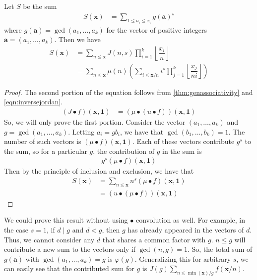 \documentclass[elemannt.tex]{subfile}
\begin{document}
		\begin{theorem}
			Let $S$ be the sum
				\begin{align*}
					S(\mathbf{x})
						& = \sum_{1\leq a_i\leq x_i}g(\mathbf{a})^{s}
				\end{align*}
			where $g(\mathbf{a})=\gcd(a_{1},\ldots,a_{k})$ for the vector of positive integers $\mathbf{a}=(a_{1},\ldots,a_{k})$. Then we have
				\begin{align*}
					S(\mathbf{x})
						& = \sum_{n\leq\mathbf{x}}J(n, s)\prod_{i=1}^{k}\left\lfloor\dfrac{x_i}{n}\right\rfloor\\
						& = \sum_{n\leq\mathbf{x}}\mu(n)\left(\sum_{i\leq\mathbf{x}/n}i^{s}\prod_{j=1}^{k}\left\lfloor\dfrac{x_j}{ni}\right\rfloor\right)
				\end{align*}
			
				\begin{proof}
					The second portion of the equation follows from \autoref{thm:genassociativity} and \ref{eqn:inversejordan}.
						\begin{align*}
							(J\bullet f)(\mathbf{x},\mathbf{1})
								& = (\mu\bullet (u\bullet f))(\mathbf{x},\mathbf{1})
						\end{align*}
					So, we will only prove the first portion. Consider the vector $(a_{1},\ldots,a_{k})$ and $g=\gcd(a_{1},\ldots,a_{k})$. Letting $a_i=gb_i$, we have that $\gcd(b_{1},\ldots,b_{k})=1$. The number of such vectors is $(\mu\bullet f)(\mathbf{x},\mathbf{1})$. Each of these vectors contribute $g^{s}$ to the sum, so for a particular $g$, the contribution of $g$ in the sum is
						\begin{align*}
							g^{s}(\mu\bullet f)(\mathbf{x},\mathbf{1})
						\end{align*}
					Then by the principle of inclusion and exclusion, we have that
						\begin{align*}
							S(\mathbf{x})
								& = \sum_{n\leq\mathbf{x}}n^{s}(\mu\bullet f)(\mathbf{x},\mathbf{1})\\
								& = (u\bullet(\mu\bullet f))(\mathbf{x},\mathbf{1})
						\end{align*}
				\end{proof}
		\end{theorem}
		
		\begin{remark}
			We could prove this result without using $\bullet$ convolution as well. For example, in the case $s=1$, if $d\mid g$ and $d<g$, then $g$ has already appeared in the vectors of $d$. Thus, we cannot consider any $d$ that shares a common factor with $g$. $n\leq g$ will contribute a new sum to the vectors only if $\gcd(n,g)=1$. So, the total sum of $g(\mathbf{a})$ with $\gcd(a_{1},\ldots,a_{k})=g$ is $\varphi(g)$. Generalizing this for arbitrary $s$, we can easily see that the contributed sum for $g$ is $J(g)\sum_{n\leq\min(\mathbf{x})/g}f(\mathbf{x}/n)$.
		\end{remark}
\end{document}
